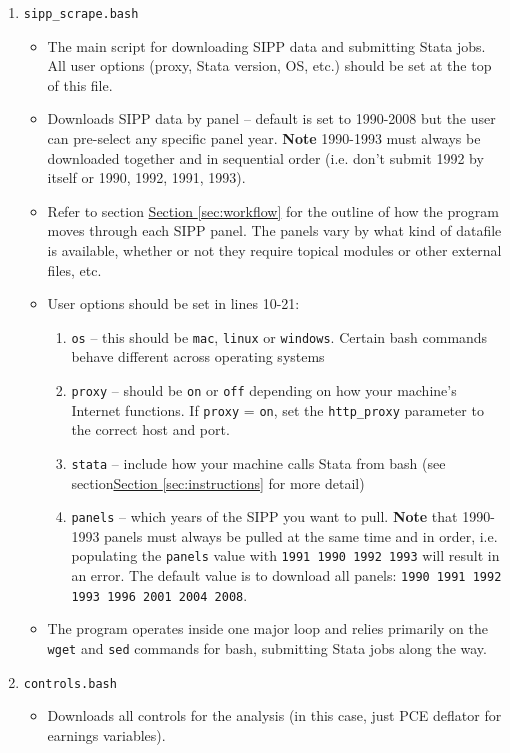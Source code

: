 \documentclass{article}
\begin{document}
\begin{enumerate}
\item {\tt sipp\_scrape.bash}
	\begin{itemize}
	\item The main script for downloading SIPP data and submitting Stata jobs. All user options (proxy, Stata version, OS, etc.) should be set at the top of this file.
	\item Downloads SIPP data by panel -- default is set to 1990-2008 but the user can pre-select any specific panel year. {\bf Note} 1990-1993 must always be downloaded together 			and in sequential order (i.e. don't submit 1992 by itself or 1990, 1992, 1991, 1993).
	\item Refer to section \hyperref[sec:workflow]{Section \ref*{sec:workflow}} for the outline of how the program moves through each SIPP panel. The panels vary by what kind of datafile is available, whether or not 			they require topical modules or other external files, etc. 
	\item User options should be set in lines 10-21:
		\begin{enumerate}
		\item {\tt os} -- this should be {\tt mac}, {\tt linux} or {\tt windows}. Certain bash commands behave different across operating systems
		\item {\tt proxy} -- should be {\tt on} or {\tt off} depending on how your machine's Internet functions. If {\tt proxy} = {\tt on}, set the {\tt http\_proxy} parameter to the correct host and port.
		\item {\tt stata} -- include how your machine calls Stata from bash (see section\hyperref[sec:instructions]{Section \ref*{sec:instructions}} for more detail)
		\item {\tt panels} -- which years of the SIPP you want to pull. {\bf Note} that 1990-1993 panels must always be pulled at the same time and in order, i.e. populating the {\tt panels} value with {\tt 1991 1990 1992 1993} will result in an error. The default value is to download all panels: {\tt 1990 1991 1992 1993 1996 2001 2004 2008}.
		\end{enumerate}
	\item The program operates inside one major loop and relies primarily on the {\tt wget} and {\tt sed} commands for bash, submitting Stata jobs along the way.
	\end{itemize}
\item {\tt controls.bash}
	\begin{itemize}
	\item Downloads all controls for the analysis  (in this case, just PCE deflator for earnings variables).
	\end{itemize}

\end{enumerate}
\end{document}
